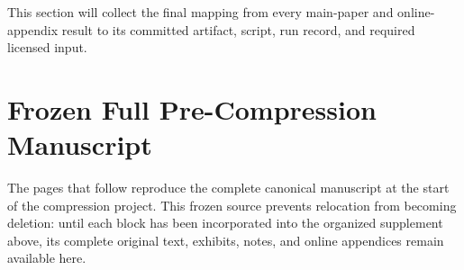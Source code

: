 \documentclass[12pt]{article}
\begin{document}
This section will collect the final mapping from every main-paper and
online-appendix result to its committed artifact, script, run record, and
required licensed input.

\clearpage
\section{Frozen Full Pre-Compression Manuscript}\label{supp:precompression-archive}

The pages that follow reproduce the complete canonical manuscript at the start
of the compression project. This frozen source prevents relocation from becoming
deletion: until each block has been incorporated into the organized supplement
above, its complete original text, exhibits, notes, and online appendices remain
available here.


\end{document}
